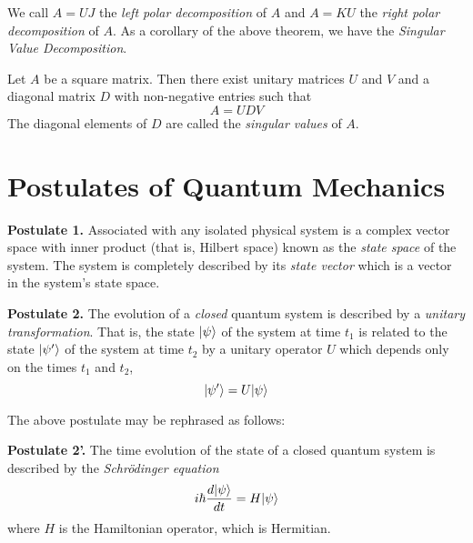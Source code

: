 We call $A = UJ$ the \textit{left polar decomposition} of $A$ and $A = KU$ the \textit{right polar decomposition} of $A$. As a corollary of the above theorem, we have the \textit{Singular Value Decomposition}.
\begin{corollary}
    Let $A$ be a square matrix. Then there exist unitary matrices $U$ and $V$ and a diagonal matrix $D$ with non-negative entries such that 
    \begin{equation*}
        A = UDV
    \end{equation*}
    The diagonal elements of $D$ are called the \textit{singular values} of $A$.
\end{corollary}

\section{Postulates of Quantum Mechanics}
\begin{mdframed}
    \textbf{Postulate 1.} Associated with any isolated physical system is a complex vector space with inner product (that is, Hilbert space) known as the \textit{state space} of the system. The system is completely described by its \textit{state vector} which is a vector in the system's state space.
\end{mdframed}

\begin{mdframed}
    \textbf{Postulate 2.} The evolution of a \textit{closed} quantum system is described by a \textit{unitary transformation}. That is, the state $|\psi\rangle$ of the system at time $t_1$ is related to the state $|\psi'\rangle$ of the system at time $t_2$ by a unitary operator $U$ which depends only on the times $t_1$ and $t_2$,
    \begin{equation*}
        |\psi'\rangle = U|\psi\rangle
    \end{equation*}
\end{mdframed}

The above postulate may be rephrased as follows:
\begin{mdframed}
    \textbf{Postulate 2'.} The time evolution of the state of a closed quantum system is described by the \textit{Schr\"odinger equation}
    \begin{equation*}
        i\hbar\frac{d|\psi\rangle}{dt}=H|\psi\rangle
    \end{equation*}
    where $H$ is the Hamiltonian operator, which is Hermitian.
\end{mdframed}

